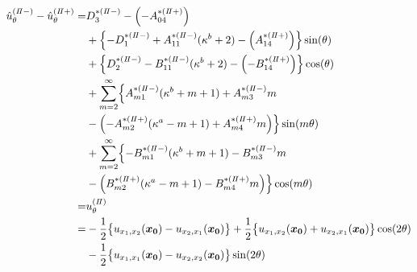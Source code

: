 \begin{align}
	\hat{u}_{\theta}^{(I\hspace{-.15em}I-)}-\hat{u}_{\theta}^{(I\hspace{-.15em}I+)} =&D_{3}^{*(I\hspace{-.15em}I-)}-\Bigl(-A_{04}^{*(I\hspace{-.15em}I+)}\Bigr)
	\nonumber
	\\
	&+\Bigl\{-D_{1}^{*(I\hspace{-.15em}I-)}+A_{11}^{*(I\hspace{-.15em}I-)}(\kappa^{b}+2)
	-\Bigl(A_{14}^{*(I\hspace{-.15em}I+)}\Bigr)\Bigr\}\sin(\theta)
	\nonumber
	\\
	&+\Bigl\{D_{2}^{*(I\hspace{-.15em}I-)}-B_{11}^{*(I\hspace{-.15em}I-)}(\kappa^{b}+2)
	-\Bigl(-B_{14}^{*(I\hspace{-.15em}I+)}\Bigr)\Bigr\}\cos(\theta)
	\nonumber
	\\
	&+\sum_{m=2}^{\infty}\Bigl\{A_{m1}^{*(I\hspace{-.15em}I-)}(\kappa^{b}+m+1)
	+A_{m3}^{*(I\hspace{-.15em}I-)}m
	\nonumber
	\\
	&-\Bigl(-A_{m2}^{*(I\hspace{-.15em}I+)}(\kappa^{a}-m+1)
	+A_{m4}^{*(I\hspace{-.15em}I+)}m\Bigr)\Bigr\}\sin(m\theta)
	\nonumber
	\\
	&+\sum_{m=2}^{\infty}\Bigl\{-B_{m1}^{*(I\hspace{-.15em}I-)}(\kappa^{b}+m+1)
	-B_{m3}^{*(I\hspace{-.15em}I-)}m
	\nonumber
	\\
	&-\Bigl(B_{m2}^{*(I\hspace{-.15em}I+)}(\kappa^{a}-m+1)
	-B_{m4}^{*(I\hspace{-.15em}I+)}m\Bigr)\Bigr\}\cos(m\theta)
	\nonumber
	\\
	=&u_{\theta}^{(I\hspace{-.15em}I)}
	\nonumber
	\\
	=&-\frac{1}{2}\bigl\{u_{x_{1},x_{2}}(\bm{x_{0}})-u_{x_{2},x_{1}}(\bm{x_{0}})\bigr\}
	+\frac{1}{2}\bigl\{u_{x_{1},x_{2}}(\bm{x_{0}})+u_{x_{2},x_{1}}(\bm{x_{0}})\bigr\}\cos(2\theta)
	\nonumber
	\\
	&-\frac{1}{2}\bigl\{u_{x_{1},x_{1}}(\bm{x_{0}})-u_{x_{2},x_{2}}(\bm{x_{0}})\bigr\}\sin(2\theta)
	\label{eq:UTh2eq}
\end{align}

